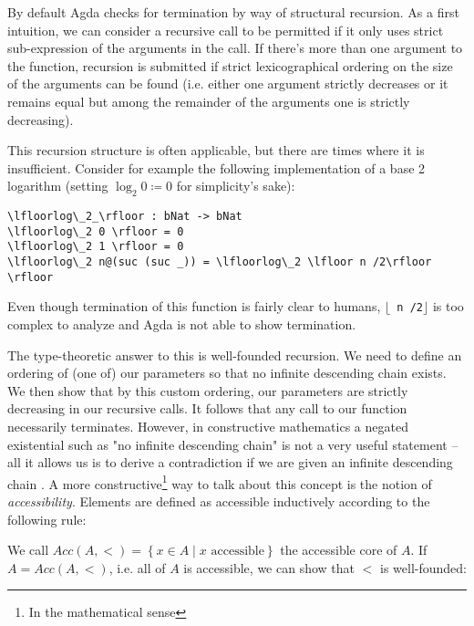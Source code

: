 By default Agda checks for termination by way of structural recursion. As a first intuition, we can consider a recursive call to be permitted if it only uses strict sub-expression of the arguments in the call. If there's more than one argument to the function, recursion is submitted if strict lexicographical ordering on the size of the arguments can be found (i.e. either one argument strictly decreases or it remains equal but among the remainder of the arguments one is strictly decreasing).

This recursion structure is often applicable, but there are times where it is insufficient. Consider for example the following implementation of a base 2 logarithm (setting $\log_2 0 \coloneqq 0$ for simplicity's sake):

\begin{lstlisting}[caption={Base 2 Logarithm},label={lst:tutorial:log},emph={log}]
\lfloorlog\_2_\rfloor : bNat -> bNat
\lfloorlog\_2 0 \rfloor = 0
\lfloorlog\_2 1 \rfloor = 0
\lfloorlog\_2 n@(suc (suc _)) = \lfloorlog\_2 \lfloor n /2\rfloor \rfloor
\end{lstlisting}

Even though termination of this function is fairly clear to humans, \texttt{$\lfloor$ n /2$\rfloor$} is too complex to analyze and Agda is not able to show termination.

The type-theoretic answer to this is well-founded recursion. We need to define an ordering of (one of) our parameters so that no infinite descending chain exists. We then show that by this custom ordering, our parameters are strictly decreasing in our recursive calls. It follows that any call to our function necessarily terminates. However, in constructive mathematics a negated existential such as "no infinite descending chain" is not a very useful statement -- all it allows us is to derive a contradiction if we are given an infinite descending chain \cite{mietek:2020:minimal}. A more constructive\footnote{In the mathematical sense} way to talk about this concept is the notion of \emph{accessibility}. Elements are defined as accessible inductively according to the following rule:

\begin{prooftree}
\end{prooftree}

We call $Acc(A, <) = \left\{ x \in A \mid x \text{ accessible} \right\}$ the accessible core of $A$. If $A = Acc(A, <)$, i.e. all of $A$ is accessible, we can show that $<$ is well-founded:

